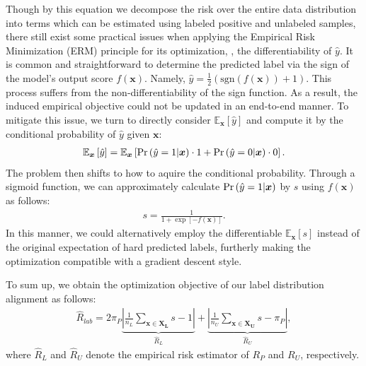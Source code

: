 \documentclass[final]{cvpr}
\newcommand{\examplex}{\bm{x}}
\newcommand{\lsubset}{\bm{X_{L}}}
\newcommand{\usubset}{\bm{X_{U}}}
\newcommand{\psudo}{\hat{y}}
\newcommand{\propsudoclass}[1]{{\rm Pr} \left( \hat{y}=#1 | \examplex \right) }
\newcommand{\outputx}{f(\examplex)}
\newcommand{\bangyan}[1]{#1}
\begin{document}
Though by this equation we decompose the risk \bangyan{over the entire data distribution} into terms which can be estimated using \bangyan{labeled positive and unlabeled samples}, there still exist some practical issues \bangyan{when applying the Empirical Risk Minimization (ERM) principle \cite{DBLP:books/daglib/0097035} for its optimization, \ie, the differentiability of $\psudo$}. It is common and straightforward to determine the predicted label via the sign of the model's output score $\outputx$. \bangyan{Namely, $\psudo=\frac{1}{2}(\text{sgn}(\outputx)+1)$. This process suffers from the non-differentiability of the sign function. As a result, the induced empirical objective could not be updated 
in an end-to-end manner. To mitigate this issue,} we turn to directly consider $\mathbb{E}_{\examplex} \left[ \hat{y} \right]$ and compute it by the conditional probability of $\hat{y}$ given $\examplex$:
\begin{align}
    \mathbb{E}_{\examplex} \left[ \hat{y} \right] = \mathbb{E}_{\examplex} \left[ \propsudoclass{1} \cdot 1 + \propsudoclass{0} \cdot 0 \right].
\end{align}
The problem then shifts to how to aquire the conditional probability. Through a sigmoid function, we can approximately calculate $\propsudoclass{1}$ by $s$ using $\outputx$ as follows:
\begin{align}
    s = \frac{1}{1+\exp{\left[ -\outputx \right]}}.
\end{align}
In this manner, \bangyan{we could alternatively employ the differentiable $\mathbb{E}_{\examplex} \left[ s \right]$ instead of the original expectation of hard predicted labels}, furtherly making the optimization compatible with a gradient descent style.

To sum up, we obtain the optimization objective of our label distribution alignment as follows:
\begin{align}
    \hat{R}_{lab} = 2\pi_{P} \underbrace{\left| \frac{1}{n_{L}} \sum_{\examplex \in \lsubset} s - 1 \right|}_{\hat{R}_{L}} + \underbrace{\left| \frac{1}{n_{U}} \sum_{\examplex \in \usubset} s - \pi_{P} \right|}_{\hat{R}_{U}}, \label{eq:distpurisk}
\end{align}
where $\hat{R}_{L}$ and $\hat{R}_{U}$ denote the empirical risk estimator of $R_{P}$ and $R_{U}$, respectively.
\end{document}
